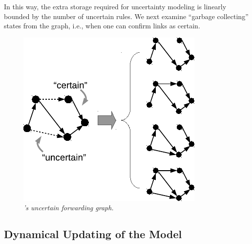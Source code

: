 In this way, the extra storage required for uncertainty modeling is linearly bounded by the number of uncertain rules.
We next examine ``garbage collecting'' states from the graph, i.e., when one can confirm links as certain.

\begin{figure}[!ht]
  \centering
  \vspace{-0.1in}
  \includegraphics[width=0.6\columnwidth]{figs/model2}
  \vspace{-0.15in}
  \caption{\em \small \name's uncertain forwarding graph. 
  }
  \vspace{-0.2in}
  \label{fig:model}
\end{figure}

\subsection{Dynamical Updating of the Model}
\label{sec:confirm}

